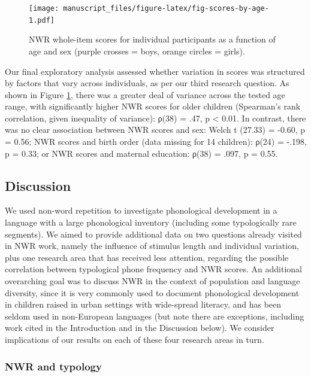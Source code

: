 \documentclass[
  american,
  ,man,floatsintext]{apa6}
\begin{document}
\begin{figure}
\centering
\texttt{[image: manuscript\_files/figure-latex/fig-scores-by-age-1.pdf]}
\caption{\label{fig:fig-scores-by-age}NWR whole-item scores for individual participants as a function of age and sex (purple crosses = boys, orange circles = girls).}
\end{figure}

Our final exploratory analysis assessed whether variation in scores was structured by factors that vary across individuals, as per our third research question. As shown in Figure \ref{fig:fig-scores-by-age}, there was a greater deal of variance across the tested age range, with significantly higher NWR scores for older children (Spearman's rank correlation, given inequality of variance): ρ(38) = .47, p \textless{} 0.01. In contrast, there was no clear association between NWR scores and sex: Welch t (27.33) = -0.60, p = 0.56; NWR scores and birth order (data missing for 14 children): ρ(24) = -.198, p = 0.33; or NWR scores and maternal education: ρ(38) = .097, p = 0.55.

\hypertarget{discussion}{%
\subsection{Discussion}\label{discussion}}

We used non-word repetition to investigate phonological development in a language with a large phonological inventory (including some typologically rare segments). We aimed to provide additional data on two questions already visited in NWR work, namely the influence of stimulus length and individual variation, plus one research area that has received less attention, regarding the possible correlation between typological phone frequency and NWR scores. An additional overarching goal was to discuss NWR in the context of population and language diversity, since it is very commonly used to document phonological development in children raised in urban settings with wide-spread literacy, and has been seldom used in non-European languages (but note there are exceptions, including work cited in the Introduction and in the Discussion below). We consider implications of our results on each of these four research areas in turn.

\hypertarget{nwr-and-typology-1}{%
\subsubsection{NWR and typology}\label{nwr-and-typology-1}}
\end{document}
